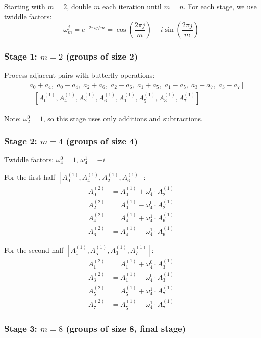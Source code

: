 \documentclass[a4paper]{article}
\theoremstyle{definition}
\begin{document}
Starting with $m=2$, double $m$ each iteration until $m=n$. For each stage, we use twiddle factors:
$$\omega_m^j = e^{-2\pi i j / m} = \cos\left(\frac{2\pi j}{m}\right) - i\sin\left(\frac{2\pi j}{m}\right)$$

\subsubsection{Stage 1: $m=2$ (groups of size 2)}

Process adjacent pairs with butterfly operations:
\begin{align*}
\ &[a_0 + a_4, \; a_0 - a_4, \; a_2 + a_6, \; a_2 - a_6, \; a_1 + a_5, \; a_1 - a_5, \; a_3 + a_7, \; a_3 - a_7] \\
\ &= [A_0^{(1)}, A_4^{(1)}, A_2^{(1)}, A_6^{(1)}, A_1^{(1)}, A_5^{(1)}, A_3^{(1)}, A_7^{(1)}]
\end{align*}

Note: $\omega_2^0 = 1$, so this stage uses only additions and subtractions.

\subsubsection{Stage 2: $m=4$ (groups of size 4)}

Twiddle factors: $\omega_4^0 = 1$, $\omega_4^1 = -i$

For the first half $[A_0^{(1)}, A_4^{(1)}, A_2^{(1)}, A_6^{(1)}]$:
\begin{align*}
A_0^{(2)} &= A_0^{(1)} + \omega_4^0 \cdot A_2^{(1)} \\
A_2^{(2)} &= A_0^{(1)} - \omega_4^0 \cdot A_2^{(1)} \\
A_4^{(2)} &= A_4^{(1)} + \omega_4^1 \cdot A_6^{(1)} \\
A_6^{(2)} &= A_4^{(1)} - \omega_4^1 \cdot A_6^{(1)}
\end{align*}

For the second half $[A_1^{(1)}, A_5^{(1)}, A_3^{(1)}, A_7^{(1)}]$:
\begin{align*}
A_1^{(2)} &= A_1^{(1)} + \omega_4^0 \cdot A_3^{(1)} \\
A_3^{(2)} &= A_1^{(1)} - \omega_4^0 \cdot A_3^{(1)} \\
A_5^{(2)} &= A_5^{(1)} + \omega_4^1 \cdot A_7^{(1)} \\
A_7^{(2)} &= A_5^{(1)} - \omega_4^1 \cdot A_7^{(1)}
\end{align*}

\subsubsection{Stage 3: $m=8$ (groups of size 8, final stage)}
\end{document}
